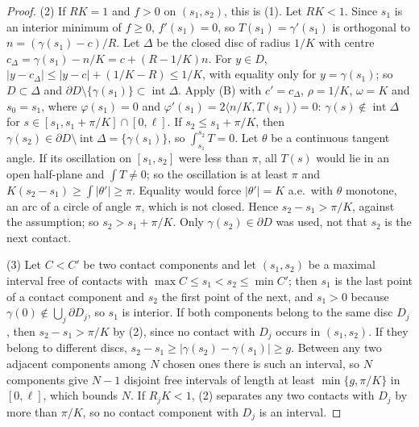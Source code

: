 \documentclass[11pt,reqno]{amsart}
\theoremstyle{definition}
\numberwithin{equation}{section}
\begin{document}
\begin{proof}
(2) If $RK = 1$ and $f > 0$ on $(s_1, s_2)$, this is (1). Let $RK < 1$. Since $s_1$ is an interior minimum of $f \ge 0$, $f'(s_1) = 0$, so $T(s_1) = \gamma'(s_1)$ is orthogonal to $n = (\gamma(s_1) - c)/R$. Let $\Delta$ be the closed disc of radius $1/K$ with centre $c_\Delta = \gamma(s_1) - n/K = c + (R - 1/K)n$. For $y \in D$, $|y - c_\Delta| \le |y - c| + (1/K - R) \le 1/K$, with equality only for $y = \gamma(s_1)$; so $D \subset \Delta$ and $\partial D \setminus \{\gamma(s_1)\} \subset \operatorname{int}\Delta$. Apply (B) with $c' = c_\Delta$, $\rho = 1/K$, $\omega = K$ and $s_0 = s_1$, where $\varphi(s_1) = 0$ and $\varphi'(s_1) = 2\langle n/K, T(s_1)\rangle = 0$: $\gamma(s) \notin \operatorname{int}\Delta$ for $s \in [s_1, s_1 + \pi/K] \cap [0,\ell]$. If $s_2 \le s_1 + \pi/K$, then $\gamma(s_2) \in \partial D \setminus \operatorname{int}\Delta = \{\gamma(s_1)\}$, so $\int_{s_1}^{s_2} T = 0$. Let $\theta$ be a continuous tangent angle. If its oscillation on $[s_1, s_2]$ were less than $\pi$, all $T(s)$ would lie in an open half-plane and $\int T \ne 0$; so the oscillation is at least $\pi$ and $K(s_2 - s_1) \ge \int|\theta'| \ge \pi$. Equality would force $|\theta'| = K$ a.e.\ with $\theta$ monotone, an arc of a circle of angle $\pi$, which is not closed. Hence $s_2 - s_1 > \pi/K$, against the assumption; so $s_2 > s_1 + \pi/K$. Only $\gamma(s_2) \in \partial D$ was used, not that $s_2$ is the next contact.

(3) Let $C < C'$ be two contact components and let $(s_1, s_2)$ be a maximal interval free of contacts with $\max C \le s_1 < s_2 \le \min C'$; then $s_1$ is the last point of a contact component and $s_2$ the first point of the next, and $s_1 > 0$ because $\gamma(0) \notin \bigcup_j\partial D_j$, so $s_1$ is interior. If both components belong to the same disc $D_j$, then $s_2 - s_1 > \pi/K$ by (2), since no contact with $D_j$ occurs in $(s_1, s_2)$. If they belong to different discs, $s_2 - s_1 \ge |\gamma(s_2) - \gamma(s_1)| \ge g$. Between any two adjacent components among $N$ chosen ones there is such an interval, so $N$ components give $N - 1$ disjoint free intervals of length at least $\min\{g, \pi/K\}$ in $[0, \ell]$, which bounds $N$. If $R_jK < 1$, (2) separates any two contacts with $D_j$ by more than $\pi/K$, so no contact component with $D_j$ is an interval.
\end{proof}
\end{document}
